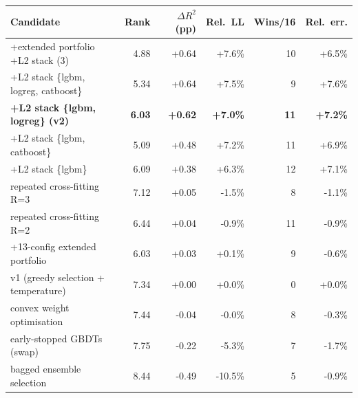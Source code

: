 \begin{tabular}{lrrrrr}
\toprule
Candidate & Rank & $\Delta R^2$ (pp) & Rel.\ LL & Wins/16 & Rel.\ err.\\
\midrule
+extended portfolio +L2 stack (3) & 4.88 & +0.64 & +7.6\% & 10 & +6.5\%\\
+L2 stack \{lgbm, logreg, catboost\} & 5.34 & +0.64 & +7.5\% & 9 & +7.6\%\\
\textbf{+L2 stack \{lgbm, logreg\} (v2)} & \textbf{6.03} & \textbf{+0.62} & \textbf{+7.0\%} & \textbf{11} & \textbf{+7.2\%}\\
+L2 stack \{lgbm, catboost\} & 5.09 & +0.48 & +7.2\% & 11 & +6.9\%\\
+L2 stack \{lgbm\} & 6.09 & +0.38 & +6.3\% & 12 & +7.1\%\\
repeated cross-fitting R=3 & 7.12 & +0.05 & -1.5\% & 8 & -1.1\%\\
repeated cross-fitting R=2 & 6.44 & +0.04 & -0.9\% & 11 & -0.9\%\\
+13-config extended portfolio & 6.03 & +0.03 & +0.1\% & 9 & -0.6\%\\
v1 (greedy selection + temperature) & 7.34 & +0.00 & +0.0\% & 0 & +0.0\%\\
convex weight optimisation & 7.44 & -0.04 & -0.0\% & 8 & -0.3\%\\
early-stopped GBDTs (swap) & 7.75 & -0.22 & -5.3\% & 7 & -1.7\%\\
bagged ensemble selection & 8.44 & -0.49 & -10.5\% & 5 & -0.9\%\\
\bottomrule
\end{tabular}
